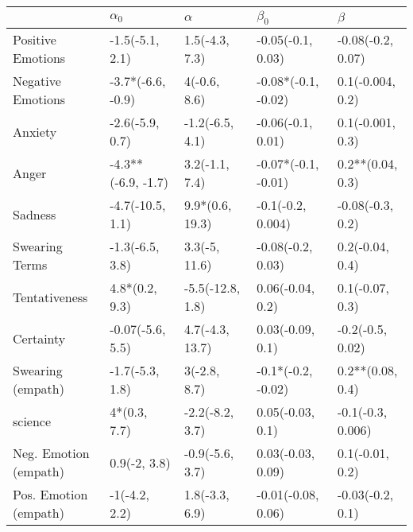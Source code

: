 \begin{tabular}{lllll}
\toprule
{} &          $\alpha_0$ &          $\alpha$ &            $\beta_0$ &            $\beta$ \\
\midrule
Positive Emotions     &     -1.5(-5.1, 2.1) &    1.5(-4.3, 7.3) &    -0.05(-0.1, 0.03) &  -0.08(-0.2, 0.07) \\
Negative Emotions     &   -3.7*(-6.6, -0.9) &      4(-0.6, 8.6) &  -0.08*(-0.1, -0.02) &   0.1(-0.004, 0.2) \\
Anxiety               &     -2.6(-5.9, 0.7) &   -1.2(-6.5, 4.1) &    -0.06(-0.1, 0.01) &   0.1(-0.001, 0.3) \\
Anger                 &  -4.3**(-6.9, -1.7) &    3.2(-1.1, 7.4) &  -0.07*(-0.1, -0.01) &   0.2**(0.04, 0.3) \\
Sadness               &    -4.7(-10.5, 1.1) &   9.9*(0.6, 19.3) &    -0.1(-0.2, 0.004) &   -0.08(-0.3, 0.2) \\
Swearing Terms        &     -1.3(-6.5, 3.8) &     3.3(-5, 11.6) &    -0.08(-0.2, 0.03) &    0.2(-0.04, 0.4) \\
Tentativeness         &      4.8*(0.2, 9.3) &  -5.5(-12.8, 1.8) &     0.06(-0.04, 0.2) &    0.1(-0.07, 0.3) \\
Certainty             &    -0.07(-5.6, 5.5) &   4.7(-4.3, 13.7) &     0.03(-0.09, 0.1) &   -0.2(-0.5, 0.02) \\
Swearing (empath)     &     -1.7(-5.3, 1.8) &      3(-2.8, 8.7) &   -0.1*(-0.2, -0.02) &   0.2**(0.08, 0.4) \\
science               &        4*(0.3, 7.7) &   -2.2(-8.2, 3.7) &     0.05(-0.03, 0.1) &  -0.1(-0.3, 0.006) \\
Neg. Emotion (empath) &        0.9(-2, 3.8) &   -0.9(-5.6, 3.7) &    0.03(-0.03, 0.09) &    0.1(-0.01, 0.2) \\
Pos. Emotion (empath) &       -1(-4.2, 2.2) &    1.8(-3.3, 6.9) &   -0.01(-0.08, 0.06) &   -0.03(-0.2, 0.1) \\
\bottomrule
\end{tabular}

